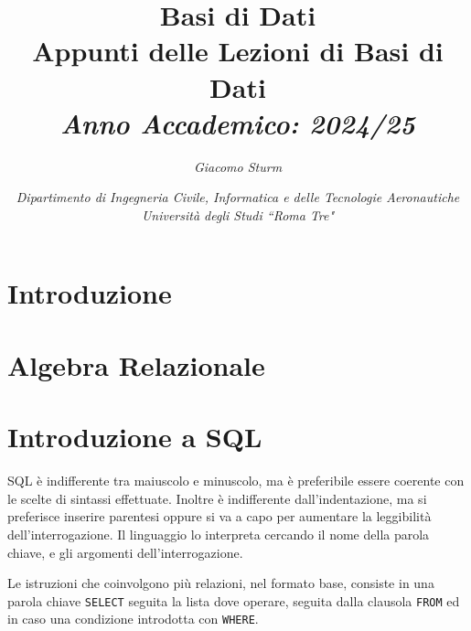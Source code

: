 \documentclass{article}
\numberwithin{equation}{subsection}
\begin{document}
\title{%
    \textbf{Basi di Dati}  \\ 
    \large Appunti delle Lezioni di Basi di Dati \\
    \textit{Anno Accademico: 2024/25}}
\author{\textit{Giacomo Sturm}}
\date{\textit{Dipartimento di Ingegneria Civile, Informatica e delle Tecnologie Aeronautiche \\
Università degli Studi ``Roma Tre"}}

\maketitle
\thispagestyle{link}

\clearpage


\pagestyle{fancy}
\fancyhead{}\fancyfoot{}
\fancyfoot[C]{\thepage}

\tableofcontents

\clearpage
{}


\section{Introduzione}

\clearpage

\section{Algebra Relazionale}

\clearpage

\section{Introduzione a SQL}


SQL è indifferente tra maiuscolo e minuscolo, ma è preferibile essere coerente con le scelte di sintassi effettuate. Inoltre è indifferente 
dall'indentazione, ma si preferisce inserire parentesi oppure si va a capo per aumentare la leggibilità dell'interrogazione. Il linguaggio lo 
interpreta cercando il nome della parola chiave, e gli argomenti dell'interrogazione.  

Le istruzioni che coinvolgono più relazioni, nel formato base, consiste in una parola chiave \verb|SELECT| seguita la lista dove operare, 
seguita dalla clausola \verb|FROM| ed in caso una condizione introdotta con \verb|WHERE|. 
\end{document}
